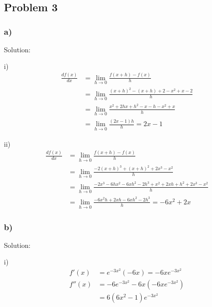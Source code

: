 \documentclass[letterpaper, 11pt]{article}
\newcommand{\1}{\mathds{1}}	%
\theoremstyle{definition}
\begin{document}
  \subsection*{Problem 3}

  \subsubsection*{a)}

  Solution:

  i)
  \begin{align*}
    \frac{d f(x)}{dx} & = \lim_{h \to 0} \frac{f(x+h) - f(x)}{h}                            \\
                      & = \lim_{h \to 0} \frac{(x+h)^{2} - (x+h) + 2 - x ^{2} + x -2}{h}    \\
                      & = \lim_{h \to 0} \frac{x ^{2} + 2hx + h ^{2} - x -h - x ^{2} +x}{h} \\
                      & = \lim_{h \to 0} \frac{(2x-1)h}{h} = 2x-1
  \end{align*}

  ii)
  \begin{align*}
    \frac{d f(x)}{dx} & = \lim_{h \to 0} \frac{f(x+h) - f(x)}{h}                                                                        \\
                      & = \lim_{h \to 0} \frac{-2(x+h)^3 + (x+h) ^{2} + 2x ^{3}  - x ^{2}}{h}                                           \\
                      & = \lim_{h \to 0} \frac{-2 x ^{3} - 6hx ^{2} -6xh ^{2} - 2h ^{3} + x ^{2} + 2xh + h ^{2} + 2 x ^{3} - x ^{2}}{h} \\
                      & = \lim_{h \to 0} \frac{-6x ^{2} h + 2xh -6 xh ^{2} -2h ^{3}}{h} = -6 x ^{2} + 2x
  \end{align*}



  \subsubsection*{b)}

  Solution:

  i)
  \begin{align*}
    f'(x)  & = e ^{-3x ^{2}} (-6 x) = -6x e ^{-3 x^{2}} \\
    f''(x) & = -6e ^{-3 x^{2}} -6x (-6x e ^{-3 x^{2}})  \\
           & = 6(6x ^{2} - 1) e ^{-3 x ^{2}}
  \end{align*}
\end{document}
